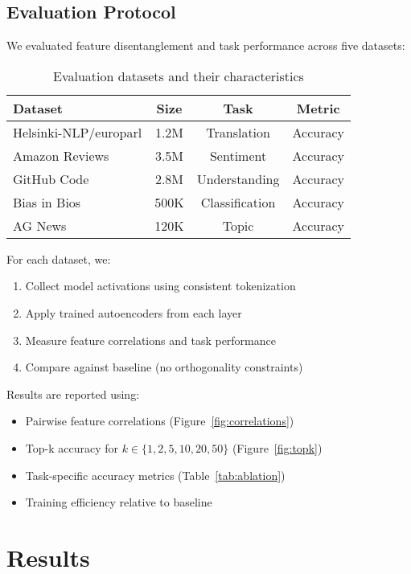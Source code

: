 \documentclass{article} %
\begin{document}
\subsection{Evaluation Protocol}
We evaluated feature disentanglement and task performance across five datasets:

\begin{table}[h]
\centering
\begin{tabular}{lccc}
\toprule
Dataset & Size & Task & Metric \\
\midrule
Helsinki-NLP/europarl & 1.2M & Translation & Accuracy \\
Amazon Reviews & 3.5M & Sentiment & Accuracy \\
GitHub Code & 2.8M & Understanding & Accuracy \\
Bias in Bios & 500K & Classification & Accuracy \\
AG News & 120K & Topic & Accuracy \\
\bottomrule
\end{tabular}
\caption{Evaluation datasets and their characteristics}
\label{tab:datasets}
\end{table}

For each dataset, we:
\begin{enumerate}
    \item Collect model activations using consistent tokenization
    \item Apply trained autoencoders from each layer
    \item Measure feature correlations and task performance
    \item Compare against baseline (no orthogonality constraints)
\end{enumerate}

Results are reported using:
\begin{itemize}
    \item Pairwise feature correlations (Figure~\ref{fig:correlations})
    \item Top-k accuracy for $k\in\{1,2,5,10,20,50\}$ (Figure~\ref{fig:topk})
    \item Task-specific accuracy metrics (Table~\ref{tab:ablation})
    \item Training efficiency relative to baseline
\end{itemize}

\section{Results}
\label{sec:results}
\end{document}
